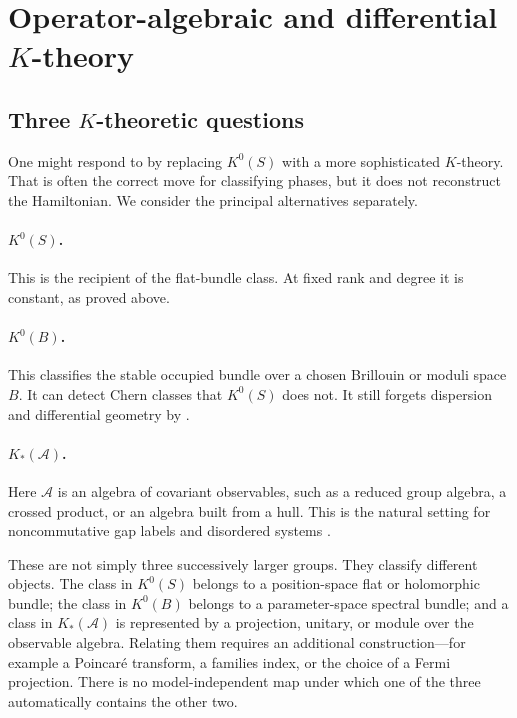 \documentclass[11pt]{article}
\theoremstyle{definition}
\theoremstyle{remark}
\begin{document}
\section{Operator-algebraic and differential
  \texorpdfstring{\(K\)}{K}-theory}
\label{sec:operator-k}

\subsection{Three \texorpdfstring{\(K\)}{K}-theoretic questions}

One might respond to  by replacing \(K^0(S)\) with a
more sophisticated \(K\)-theory.  That is often the correct move for
classifying phases, but it does not reconstruct the Hamiltonian.  We consider
the principal alternatives separately.

\paragraph{\(K^0(S)\).}
This is the recipient of the flat-bundle class.  At fixed rank and degree it
is constant, as proved above.

\paragraph{\(K^0(B)\).}
This classifies the stable occupied bundle over a chosen Brillouin or moduli
space \(B\).  It can detect Chern classes that \(K^0(S)\) does not.  It still
forgets dispersion and differential geometry by
.

\paragraph{\(K_*(\mathcal A)\).}
Here \(\mathcal A\) is an algebra of covariant observables, such as a reduced
group algebra, a crossed product, or an algebra built from a hull.  This is
the natural setting for noncommutative gap labels and disordered systems
\cite{BellissardKTheory,BellissardVanElstSchulzBaldes,ConnesNCG}.

These are not simply three successively larger groups.  They classify
different objects.  The class in \(K^0(S)\) belongs to a position-space flat
or holomorphic bundle; the class in \(K^0(B)\) belongs to a parameter-space
spectral bundle; and a class in \(K_*(\mathcal A)\) is represented by a
projection, unitary, or module over the observable algebra.  Relating them
requires an additional construction---for example a Poincar\'e transform, a
families index, or the choice of a Fermi projection.  There is no
model-independent map under which one of the three automatically contains
the other two.
\end{document}
